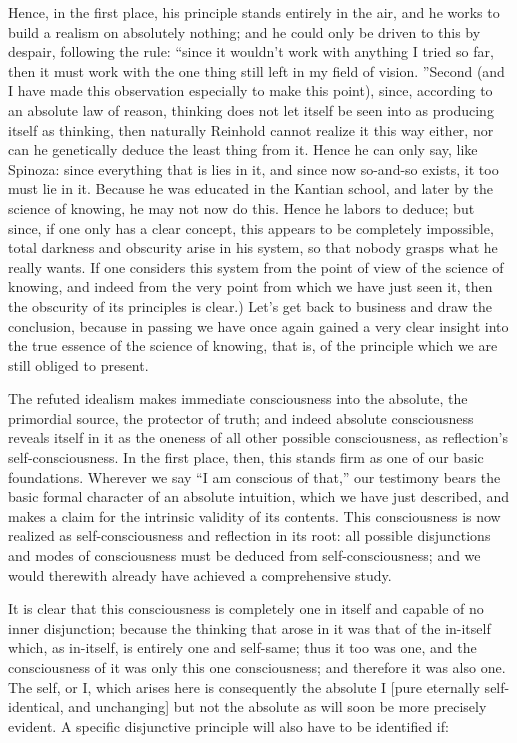 Hence, in the first place, his principle stands entirely in the air,
and he works to build a realism on absolutely nothing;
and he could only be driven to this by despair, following the rule:
“since it wouldn’t work with anything I tried so far,
then it must work with the one thing still left in my field of vision.
”Second (and I have made this observation especially to make this point),
since, according to an absolute law of reason,
thinking does not let itself be seen into
as producing itself as thinking,
then naturally Reinhold cannot realize it this way either,
nor can he genetically deduce the least thing from it.
Hence he can only say, like Spinoza:
since everything that is lies in it,
and since now so-and-so exists,
it too must lie in it.
Because he was educated in the Kantian school,
and later by the science of knowing,
he may not now do this.
Hence he labors to deduce;
but since, if one only has a clear concept,
this appears to be completely impossible,
total darkness and obscurity arise in his system,
so that nobody grasps what he really wants.
If one considers this system from
the point of view of the science of knowing,
and indeed from the very point from
which we have just seen it,
then the obscurity of its principles is clear.)
Let’s get back to business and draw the conclusion,
because in passing we have once again gained
a very clear insight into the true essence
of the science of knowing, that is,
of the principle which we are still obliged to present.

The refuted idealism makes immediate consciousness
into the absolute, the primordial source, the protector of truth;
and indeed absolute consciousness reveals itself in it
as the oneness of all other possible consciousness,
as reflection’s self-consciousness.
In the first place, then, this stands firm
as one of our basic foundations.
Wherever we say “I am conscious of that,”
our testimony bears the basic formal character
of an absolute intuition,
which we have just described,
and makes a claim for the intrinsic validity of its contents.
This consciousness is now realized as self-consciousness
and reflection in its root:
all possible disjunctions and modes of consciousness
must be deduced from self-consciousness;
and we would therewith already
have achieved a comprehensive study.

It is clear that this consciousness is
completely one in itself
and capable of no inner disjunction;
because the thinking that arose in it was
that of the in-itself
which, as in-itself, is
entirely one and self-same;
thus it too was one,
and the consciousness of it was
only this one consciousness;
and therefore it was also one.
The self, or I, which arises here is
consequently the absolute I
[pure eternally self-identical, and unchanging]
but not the absolute as will soon be more precisely evident.
A specific disjunctive principle will
also have to be identified if:


